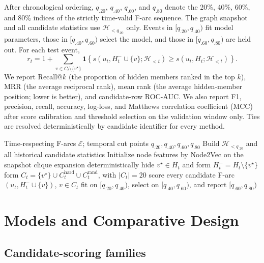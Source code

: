 \documentclass{svproc}
\newcommand{\Hcal}{\mathcal{H}}
\newcommand{\Ecal}{\mathcal{E}}
\newcommand{\indicator}{\mathbf{1}}
\begin{document}
After chronological ordering, $q_{.20}$, $q_{.40}$, $q_{.60}$, and $q_{.80}$ denote the 20\%, 40\%, 60\%, and 80\% indices of the strictly time-valid F-arc sequence. The graph snapshot and all candidate statistics use $\Hcal_{<q_{.20}}$ only. Events in $[q_{.20},q_{.40})$ fit model parameters, those in $[q_{.40},q_{.60})$ select the model, and those in $[q_{.60},q_{.80})$ are held out. For each test event,
\begin{equation}
r_t=1+\sum_{v\in C_t\setminus\{v^\star\}}\indicator\!\left\{s(u_t,H_t^-\cup\{v\};\Hcal_{<t})\geq s(u_t,H_t;\Hcal_{<t})\right\}.
\label{eq:rank}
\end{equation}
We report Recall@$k$ (the proportion of hidden members ranked in the top $k$), MRR (the average reciprocal rank), mean rank (the average hidden-member position; lower is better), and candidate-row ROC-AUC. We also report F1, precision, recall, accuracy, log-loss, and Matthews correlation coefficient (MCC) after score calibration and threshold selection on the validation window only. Ties are resolved deterministically by candidate identifier for every method.

\begin{algorithm}[t]
\caption{Fixed-snapshot temporal F-hyperlink ranking}
\label{alg:protocol}
\begin{algorithmic}[1]
\Require Time-respecting F-arcs $\Ecal$; temporal cut points $q_{.20},q_{.40},q_{.60},q_{.80}$
\State Build $\Hcal_{<q_{.20}}$ and all historical candidate statistics
\State Initialize node features by Node2Vec on the snapshot clique expansion
  \State deterministically hide $v^\star\in H_t$ and form $H_t^-=H_t\setminus\{v^\star\}$
  \State form $C_t=\{v^\star\}\cup C_t^{\mathrm{hard}}\cup C_t^{\mathrm{rand}}$, with $|C_t|=20$
  \State score every candidate F-arc $(u_t,H_t^-\cup\{v\})$, $v\in C_t$
\EndFor
\State fit on $[q_{.20},q_{.40})$, select on $[q_{.40},q_{.60})$, and report $[q_{.60},q_{.80})$
\end{algorithmic}
\end{algorithm}

\section{Models and Comparative Design}
\label{sec:models}

\subsection{Candidate-scoring families}
\end{document}
